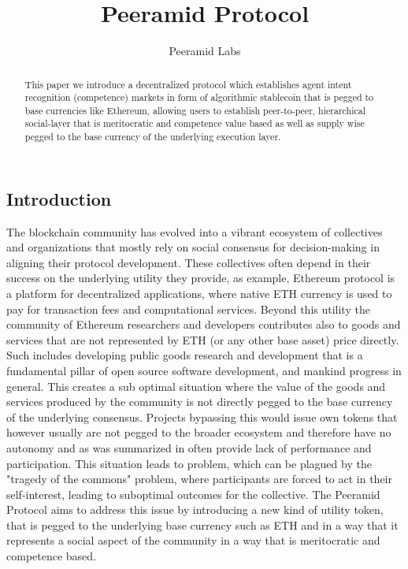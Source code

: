 \documentclass{article}
\title{Peeramid Protocol}
\author{Peeramid Labs}
\begin{document}
\begin{CJK}{UTF8}{gbsn}

    \maketitle


    \begin{abstract}
        This paper we introduce a decentralized protocol which establishes agent intent recognition (competence) markets in form of algorithmic stablecoin that is pegged to base currencies like Ethereum, allowing users to establish peer-to-peer, hierarchical social-layer that is meritocratic and competence value based as well as supply wise pegged to the base currency of the underlying execution layer.
    \end{abstract}

    \begin{multicols}{2}
        \section{Introduction}The blockchain community has evolved into a vibrant ecosystem of collectives and organizations that mostly rely on social consensus for decision-making in aligning their protocol development. These collectives often depend in their success on the underlying utility they provide, as example, Ethereum protocol is a platform for decentralized applications, where native ETH currency is used to pay for transaction fees and computational services. Beyond this utility the community of Ethereum researchers and developers contributes also to goods and services that are not represented by ETH (or any other base asset) price directly. Such includes developing public goods research and development that is a fundamental pillar of open source software development, and mankind progress in general. This creates a sub optimal situation where the value of the goods and services produced by the community is not directly pegged to the base currency of the underlying consensus. Projects bypassing this would issue own tokens that however usually are not pegged to the broader ecosystem and therefore have no autonomy and as was summarized in \cite{PeerskyACID2024} often provide lack of performance and participation. This situation leads to problem, which can be plagued by the "tragedy of the commons" problem, where participants are forced to act in their self-interest, leading to suboptimal outcomes for the collective.
        The Peeramid Protocol aims to address this issue by introducing a new kind of utility token, that is pegged to the underlying base currency such as ETH and in a way that it represents a social aspect of the community in a way that is meritocratic and competence based.
        



\end{multicols}
\end{CJK}
\end{document}
